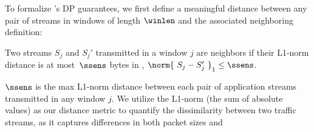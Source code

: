 To formalize {\sys}'s DP guarantees, we first define a meaningful
distance between any pair of streams in windows of length $\winlen$ and the
associated neighboring definition:


\begin{definition}
Two streams $S_{j}$ and $S_{j}'$ transmitted in a window $j$
are neighbors
if their L1-norm distance is at most~$\ssens$ bytes in
, \ie
${\norm{~S_{j} - S_{j}'~}}_1 \leq \ssens$.

\label{def:neighboring-streams}
\end{definition}

$\ssens$ is the max L1-norm distance between each pair of application streams
transmitted in any window $j$.
We utilize the L1-norm (the sum of absolute values) as our distance metric
to quantify the dissimilarity between two traffic streams, as it captures
differences in both packet sizes and 




